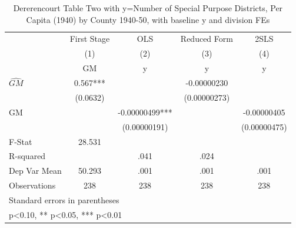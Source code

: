 \begin{table}[htbp]\centering
\def\sym#1{\ifmmode^{#1}\else\(^{#1}\)\fi}
\caption{Dererencourt Table Two with y=Number of Special Purpose Districts, Per Capita (1940) by County 1940-50, with baseline y and division FEs}
\begin{tabular}{l*{4}{c}}
\toprule
                    & First Stage   &         OLS   &Reduced Form   &        2SLS   \\
                    &\multicolumn{1}{c}{(1)}&\multicolumn{1}{c}{(2)}&\multicolumn{1}{c}{(3)}&\multicolumn{1}{c}{(4)}\\
                    &\multicolumn{1}{c}{GM}&\multicolumn{1}{c}{y}&\multicolumn{1}{c}{y}&\multicolumn{1}{c}{y}\\
\midrule
$\hat{GM}$          &       0.567***&               & -0.00000230   &               \\
                    &    (0.0632)   &               &(0.00000273)   &               \\
\addlinespace
GM                  &               & -0.00000499***&               & -0.00000405   \\
                    &               &(0.00000191)   &               &(0.00000475)   \\
\midrule
F-Stat              &      28.531   &               &               &               \\
R-squared           &               &        .041   &        .024   &               \\
Dep Var Mean        &      50.293   &        .001   &        .001   &        .001   \\
Observations        &         238   &         238   &         238   &         238   \\
\bottomrule
\multicolumn{5}{l}{\footnotesize Standard errors in parentheses}\\
\multicolumn{5}{l}{\footnotesize * p<0.10, ** p<0.05, *** p<0.01}\\
\end{tabular}
\end{table}
